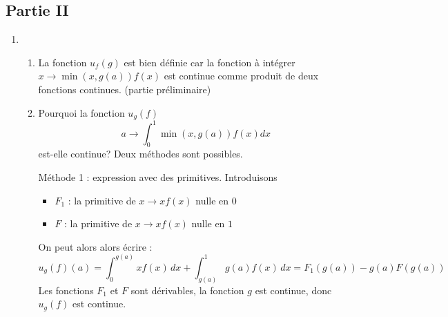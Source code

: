 \subsection*{Partie II}
\begin{enumerate}
 \item \begin{enumerate}
 \item La fonction $u_f(g)$ est bien définie car la fonction à intégrer $x\rightarrow \min(x,g(a))f(x)$
est continue comme produit de deux fonctions continues. (partie préliminaire) 
\item Pourquoi la fonction $u_g(f)$
\begin{displaymath}
 a \rightarrow \int_0 ^1 \min(x,g(a))f(x) dx
\end{displaymath}
est-elle continue? Deux méthodes sont possibles.

Méthode 1 : expression avec des primitives.\newline
Introduisons
\begin{itemize}
 \item $F_1$ : la primitive de $x\rightarrow xf(x)$ nulle en $0$
\item $F$ : la primitive de $x\rightarrow xf(x)$ nulle en $1$
\end{itemize}
On peut alors alors écrire :
\begin{displaymath}
 u_g(f)(a)= \int_{0}^{g(a)}xf(x)\,dx + \int_{g(a)}^{1} g(a)f(x)\,dx 
= F_1(g(a))-g(a)F(g(a))  
\end{displaymath}
Les fonctions $F_1$ et $F$ sont dérivables, la fonction $g$ est continue, donc $u_g(f)$ est continue.


\end{enumerate}
\end{enumerate}
